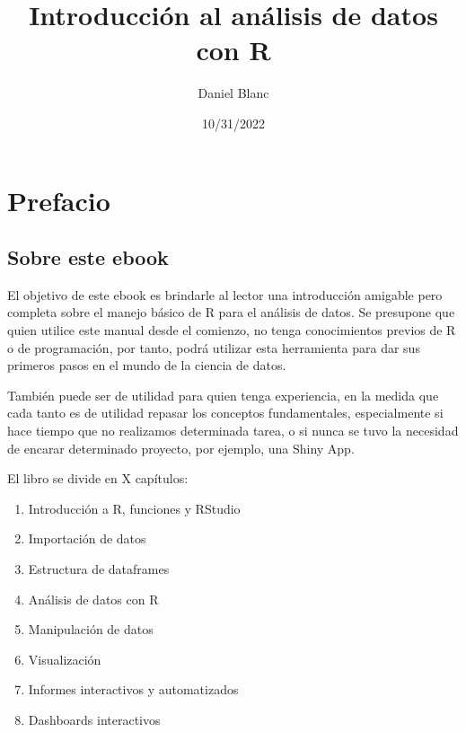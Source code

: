 \documentclass[
  letterpaper,
  DIV=11,
  numbers=noendperiod]{scrreprt}
\title{Introducción al análisis de datos con R}
\author{Daniel Blanc}
\date{10/31/2022}
\renewcommand*\contentsname{Table of contents}
\newcommand\contentsname{Table of contents}
\begin{document}
\maketitle
\ifdefined\Shaded\renewenvironment{Shaded}{\begin{tcolorbox}[borderline west={3pt}{0pt}{shadecolor}, enhanced, boxrule=0pt, interior hidden, breakable, frame hidden, sharp corners]}{\end{tcolorbox}}\fi

\renewcommand*\contentsname{Table of contents}
{
\hypersetup{linkcolor=}
\setcounter{tocdepth}{2}
\tableofcontents
}

\hypertarget{prefacio}{%
\chapter*{Prefacio}\label{prefacio}}

\hypertarget{sobre-este-ebook}{%
\section*{Sobre este ebook}\label{sobre-este-ebook}}

El objetivo de este ebook es brindarle al lector una introducción
amigable pero completa sobre el manejo básico de R para el análisis de
datos. Se presupone que quien utilice este manual desde el comienzo, no
tenga conocimientos previos de R o de programación, por tanto, podrá
utilizar esta herramienta para dar sus primeros pasos en el mundo de la
ciencia de datos.

También puede ser de utilidad para quien tenga experiencia, en la medida
que cada tanto es de utilidad repasar los conceptos fundamentales,
especialmente si hace tiempo que no realizamos determinada tarea, o si
nunca se tuvo la necesidad de encarar determinado proyecto, por ejemplo,
una Shiny App.

El libro se divide en X capítulos:

\begin{enumerate}
\def\labelenumi{\arabic{enumi}.}
\item
  Introducción a R, funciones y RStudio
\item
  Importación de datos
\item
  Estructura de dataframes
\item
  Análisis de datos con R
\item
  Manipulación de datos
\item
  Visualización
\item
  Informes interactivos y automatizados
\item
  Dashboards interactivos
\end{enumerate}
\end{document}

